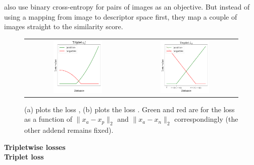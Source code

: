 \citep{Li14, ahmed2015improved} also use binary cross-entropy for pairs of images as an objective. But instead of using a mapping from image to descriptor space first, they map a couple of images straight to the similarity score.



\begin{figure}
\begin{center}
    \begin{tabular}[t]{cc}
    \includegraphics[width=0.48\textwidth]{Figures/triplet_l22.png}&
        \includegraphics[width=0.48\textwidth]{Figures/triplet_l2.png} 
    \end{tabular}
    \caption{(a) plots the loss , (b) plots the loss . Green and red are for the loss as a function of $\|x_a - x_p \|_2$ and $\|x_a - x_n \|_2$ correspondingly (the other addend remains fixed).}
    \label{fig:triplet}
\end{center}
\end{figure}

\newpage
\bigskip\indent\textbf{Tripletwise losses}\\
\bigskip\indent\textbf{Triplet loss}

